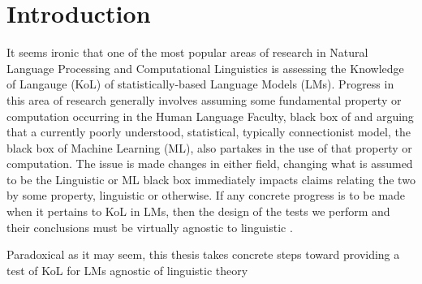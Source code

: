 \chapter*{Introduction}
It seems ironic that one of the most popular areas of research in Natural Language Processing and Computational Linguistics is assessing the Knowledge of Langauge (KoL) of statistically-based Language Models (LMs).  \DIFaddbegin {}\DIFaddend Progress in this area of research generally involves assuming some fundamental property or computation occurring in the Human Language Faculty, \DIFdelbegin {}\DIFdelend \DIFaddbegin {}\DIFaddend black box of \DIFdelbegin {}\DIFdelend \DIFaddbegin {}\DIFaddend and arguing that a currently poorly understood, statistical, typically connectionist model, the black box of Machine Learning (ML), also partakes in the use of that property or computation.
The issue is made \DIFdelbegin {}\DIFdelend \DIFaddbegin {}\DIFaddend changes in either field, \DIFdelbegin {}\DIFdelend \DIFaddbegin {}\DIFaddend changing what is assumed to be \DIFdelbegin {}\DIFdelend \DIFaddbegin {}\DIFaddend the Linguistic or ML black box immediately impacts \DIFdelbegin {}\DIFdelend claims relating the two by some \DIFdelbegin {}\DIFdelend \DIFaddbegin {}\DIFaddend property, linguistic or otherwise\DIFaddbegin {}\DIFaddend .  If any concrete progress is to be made when it pertains to KoL in LMs, then the design of the tests we perform and their conclusions must be virtually agnostic to linguistic \DIFdelbegin {}\DIFdelend \DIFaddbegin {}\DIFaddend .

Paradoxical as it may seem, this thesis takes concrete steps toward providing a test of KoL for LMs agnostic of linguistic theory
\DIFaddbegin 

